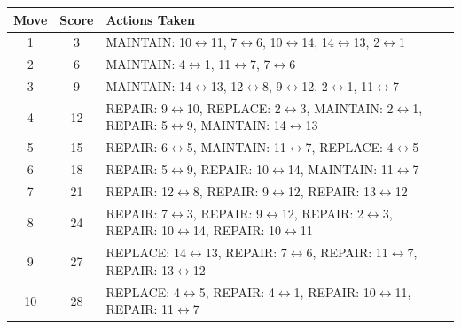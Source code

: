 \documentclass[12pt,a4paper]{report}
\begin{document}

        \begin{table}[h!]
            \centering
            \begin{tabular}{ccp{12cm}}
            \toprule
            \textbf{Move} & \textbf{Score} & \textbf{Actions Taken} \\
            \midrule
            1 & 3 & MAINTAIN: 10\texttt{$\leftrightarrow$}11, 7\texttt{$\leftrightarrow$}6, 10\texttt{$\leftrightarrow$}14, 14\texttt{$\leftrightarrow$}13, 2\texttt{$\leftrightarrow$}1 \\
            2 & 6 & MAINTAIN: 4\texttt{$\leftrightarrow$}1, 11\texttt{$\leftrightarrow$}7, 7\texttt{$\leftrightarrow$}6 \\
            3 & 9 & MAINTAIN: 14\texttt{$\leftrightarrow$}13, 12\texttt{$\leftrightarrow$}8, 9\texttt{$\leftrightarrow$}12, 2\texttt{$\leftrightarrow$}1, 11\texttt{$\leftrightarrow$}7 \\
            4 & 12 & REPAIR: 9\texttt{$\leftrightarrow$}10, REPLACE: 2\texttt{$\leftrightarrow$}3, MAINTAIN: 2\texttt{$\leftrightarrow$}1, REPAIR: 5\texttt{$\leftrightarrow$}9, MAINTAIN: 14\texttt{$\leftrightarrow$}13 \\
            5 & 15 & REPAIR: 6\texttt{$\leftrightarrow$}5, MAINTAIN: 11\texttt{$\leftrightarrow$}7, REPLACE: 4\texttt{$\leftrightarrow$}5 \\
            6 & 18 & REPAIR: 5\texttt{$\leftrightarrow$}9, REPAIR: 10\texttt{$\leftrightarrow$}14, MAINTAIN: 11\texttt{$\leftrightarrow$}7 \\
            7 & 21 & REPAIR: 12\texttt{$\leftrightarrow$}8, REPAIR: 9\texttt{$\leftrightarrow$}12, REPAIR: 13\texttt{$\leftrightarrow$}12 \\
            8 & 24 & REPAIR: 7\texttt{$\leftrightarrow$}3, REPAIR: 9\texttt{$\leftrightarrow$}12, REPAIR: 2\texttt{$\leftrightarrow$}3, REPAIR: 10\texttt{$\leftrightarrow$}14, REPAIR: 10\texttt{$\leftrightarrow$}11 \\
            9 & 27 & REPLACE: 14\texttt{$\leftrightarrow$}13, REPAIR: 7\texttt{$\leftrightarrow$}6, REPAIR: 11\texttt{$\leftrightarrow$}7, REPAIR: 13\texttt{$\leftrightarrow$}12 \\
            10 & 28 & REPLACE: 4\texttt{$\leftrightarrow$}5, REPAIR: 4\texttt{$\leftrightarrow$}1, REPAIR: 10\texttt{$\leftrightarrow$}11, REPAIR: 11\texttt{$\leftrightarrow$}7 \\

\end{tabular}
\end{table}
\end{document}
